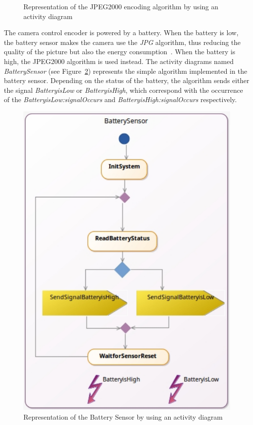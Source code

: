 \begin{figure}[h]
\begin{minipage}{0.45\textwidth}
			\caption{Representation of the JPEG2000 encoding algorithm by using an activity diagram}
			\label{fig:dojpeg2000}
		\end{minipage}
	\end{figure}
	

The camera control encoder is powered by a battery. When the battery is low, the battery sensor makes the camera use the \emph{JPG} algorithm, thus reducing the quality of the picture but also the energy consumption~\cite{encodingcomparison}. When the battery is high, the JPEG2000 algorithm is used instead. The activity diagrams named \emph{BatterySensor} (see Figure~\ref{fig:batterysensor}) represents the simple algorithm implemented in the battery sensor. Depending on the status of the battery, the algorithm sends either the signal \emph{BatteryisLow} or \emph{BatteryisHigh}, which correspond with the occurrence of the \mse \emph{BatteryisLow:signalOccurs} and \emph{BatteryisHigh:signalOccurs} respectively.
	
	
			\begin{figure}[h]
				\center
				\includegraphics[width=.4\columnwidth]{examples/figs/BatterySensor.pdf}
				\caption{Representation of the Battery Sensor by using an activity diagram}
				\label{fig:batterysensor}
			\end{figure}
			
